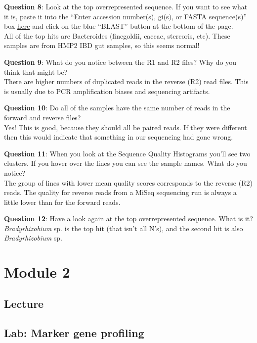 \documentclass[
]{book}
\begin{document}
\textbf{Question 8}: Look at the top overrepresented sequence. If you want to see what it is, paste it into the ``Enter accession number(s), gi(s), or FASTA sequence(s)'' box \href{https://blast.ncbi.nlm.nih.gov/Blast.cgi?PROGRAM=blastn&PAGE_TYPE=BlastSearch&LINK_LOC=blasthome}{here} and click on the blue ``BLAST'' button at the bottom of the page.\\
All of the top hits are Bacteroides (finegoldii, caccae, stercoris, etc). These samples are from HMP2 IBD gut samples, so this seems normal!

\textbf{Question 9}: What do you notice between the R1 and R2 files? Why do you think that might be?\\
There are higher numbers of duplicated reads in the reverse (R2) read files. This is usually due to PCR amplification biases and sequencing artifacts.

\textbf{Question 10}: Do all of the samples have the same number of reads in the forward and reverse files?\\
Yes! This is good, because they should all be paired reads. If they were different then this would indicate that something in our sequencing had gone wrong.

\textbf{Question 11}: When you look at the Sequence Quality Histograms you'll see two clusters. If you hover over the lines you can see the sample names. What do you notice?\\
The group of lines with lower mean quality scores corresponds to the reverse (R2) reads. The quality for reverse reads from a MiSeq sequencing run is always a little lower than for the forward reads.

\textbf{Question 12}: Have a look again at the top overrepresented sequence. What is it?\\
\emph{Bradyrhizobium} sp. is the top hit (that isn't all N's), and the second hit is also \emph{Bradyrhizobium} sp.

\chapter{Module 2}\label{module-2}

\section{Lecture}\label{lecture-1}

\section{Lab: Marker gene profiling}\label{lab-marker-gene-profiling}
\end{document}
